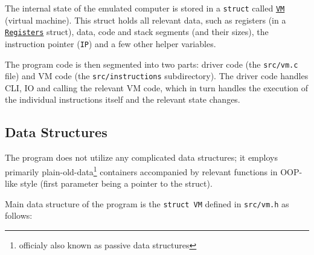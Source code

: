 \documentclass[12pt,a4paper]{paper}
\newcommand{\code}[1]{\texttt{#1}}
\begin{document}
The internal state of the emulated computer is stored in a \code{struct} called
\hyperlink{vm}{\code{VM}} (virtual machine). This struct holds all relevant
data, such as registers (in a \hyperlink{registers}{\code{Registers}} struct),
data, code and stack segments (and their sizes), the instruction pointer
(\code{IP}) and a few other helper variables.

The program code is then segmented into two parts: driver code (the
\code{src/vm.c} file) and VM code (the \code{src/instructions} subdirectory).
The driver code handles CLI, IO and calling the relevant VM code, which in turn
handles the execution of the individual instructions itself and the relevant
state changes. 

\subsection{Data Structures}

The program does not utilize any complicated data structures; it employs
primarily plain-old-data\footnote{officialy also known as passive data
structures} containers accompanied by relevant functions in OOP-like style
(first parameter being a pointer to the struct).

Main data structure of the program is the \hypertarget{vm}{\code{struct VM}}
defined in \code{src/vm.h} as follows:

\begin{center}
\end{center}
\end{document}
